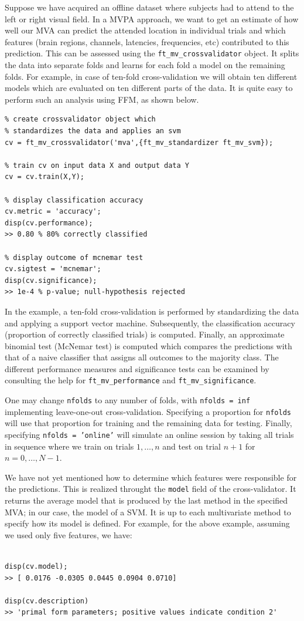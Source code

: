 \documentclass{article}
\renewcommand{\t}[1]{{\tt #1}}
\begin{document}
Suppose we have acquired an offline dataset where subjects had to attend to the left or right visual field. In a MVPA approach, we want to get an estimate of how well our MVA can predict the attended location in individual trials and which features (brain regions, channels, latencies, frequencies, etc) contributed to this prediction. This can be assessed using the \t{ft\_mv\_crossvalidator} object. It splits the data into separate folds and learns for each fold a model on the remaining folds. For example, in case of ten-fold cross-validation we will obtain ten different models which are evaluated on ten different parts of the data. It is quite easy to perform such an analysis using FFM, as shown below.
\begin{verbatim}
% create crossvalidator object which 
% standardizes the data and applies an svm
cv = ft_mv_crossvalidator('mva',{ft_mv_standardizer ft_mv_svm});

% train cv on input data X and output data Y
cv = cv.train(X,Y);

% display classification accuracy
cv.metric = 'accuracy';
disp(cv.performance);
>> 0.80 % 80% correctly classified

% display outcome of mcnemar test
cv.sigtest = 'mcnemar';
disp(cv.significance);
>> 1e-4 % p-value; null-hypothesis rejected
\end{verbatim}
In the example, a ten-fold cross-validation is performed by standardizing the data and applying a support vector machine. Subsequently, the classification accuracy (proportion of correctly classified trials) is computed. Finally, an approximate binomial test (McNemar test) is computed which compares the predictions with that of a naive classifier that assigns all outcomes to the majority class. The different performance measures and significance tests can be examined by consulting the help for \t{ft\_mv\_performance} and \t{ft\_mv\_significance}. 

One may change \t{nfolds} to any number of folds, with \t{nfolds = inf} implementing leave-one-out cross-validation. Specifying a proportion for \t{nfolds} will use that proportion for training and the remaining data for testing. Finally, specifying \t{nfolds = 'online'} will simulate an online session by taking all trials in sequence where we train on trials $1,\ldots,n$ and test on trial $n+1$ for $n=0,\ldots,N-1$.

We have not yet mentioned how to determine which features were responsible for the predictions. This is realized throught the \t{model} field of the cross-validator. It returns the average model that is produced by the last method in the specified MVA; in our case, the model of a SVM. It is up to each multivariate method to  specify how its model is defined. For example, for the above example, assuming we used only five features, we have:
\begin{verbatim}

disp(cv.model);
>> [ 0.0176 -0.0305 0.0445 0.0904 0.0710]

disp(cv.description)
>> 'primal form parameters; positive values indicate condition 2'

\end{verbatim}
\end{document}
